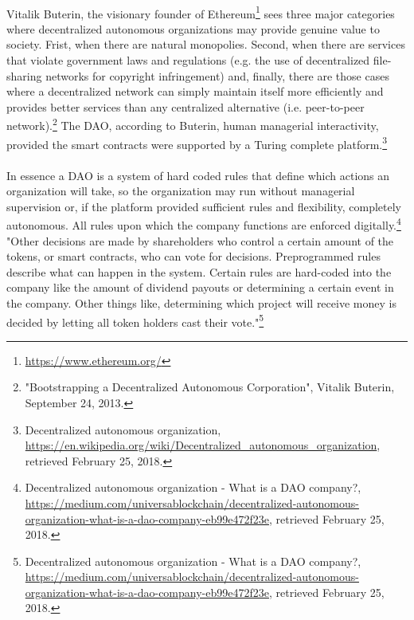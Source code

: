 \documentclass{scrartcl}
\begin{document}
     \paragraph{}
     Vitalik Buterin, the visionary founder of Ethereum\footnote{\url{https://www.ethereum.org/}} sees three major categories where decentralized autonomous organizations may provide genuine value to society. Frist, when there are natural monopolies. Second, when there are services that violate government laws and regulations (e.g. the use of decentralized file-sharing networks for copyright infringement) and, finally, there are those cases where a decentralized network can simply maintain itself more efficiently and provides better services than any centralized alternative (i.e. peer-to-peer network).\footnote{"Bootstrapping a Decentralized Autonomous Corporation", Vitalik Buterin, September 24, 2013.} The DAO, according to Buterin, human managerial interactivity, provided the smart contracts were supported by a Turing complete platform.\footnote{Decentralized autonomous organization, \url{https://en.wikipedia.org/wiki/Decentralized_autonomous_organization}, retrieved February 25, 2018.} 
     
     \paragraph{}
     In essence a DAO is a system of hard coded rules that define which actions an organization will take, so the organization may run without managerial supervision or, if the platform provided sufficient rules and flexibility, completely autonomous. All rules upon which the company functions are enforced digitally.\footnote{Decentralized autonomous organization - What is a DAO company?, \url{https://medium.com/universablockchain/decentralized-autonomous-organization-what-is-a-dao-company-eb99e472f23e}, retrieved February 25, 2018.} "Other decisions are made by shareholders who control a certain amount of the tokens, or smart contracts, who can vote for decisions. Preprogrammed rules describe what can happen in the system. Certain rules are hard-coded into the company like the amount of dividend payouts or determining a certain event in the company. Other things like, determining which project will receive money is decided by letting all token holders cast their vote."\footnote{Decentralized autonomous organization - What is a DAO company?, \url{https://medium.com/universablockchain/decentralized-autonomous-organization-what-is-a-dao-company-eb99e472f23e}, retrieved February 25, 2018.}
     
\end{document}
